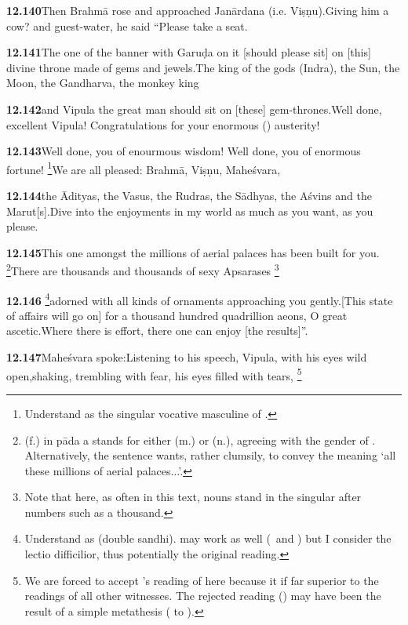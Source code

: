 \textbf{12.140}Then Brahmā rose and approached Janārdana (i.e. Viṣṇu).Giving him a cow? and guest-water, he said ``Please take a seat.%


\textbf{12.141}The one of the banner with Garuḍa on it [should please sit] on [this]                         divine throne made of gems and jewels.The king of the gods (Indra), the Sun, the Moon, the Gandharva, the monkey king%


\textbf{12.142}and Vipula the great man should sit on [these] gem-thrones.Well done, excellent Vipula! Congratulations for your enormous () austerity!%


\textbf{12.143}Well done, you of enourmous wisdom! Well done, you of enormous fortune!%
\footnote{Understand  as the singular vocative masculine of .  }We are all pleased: Brahmā, Viṣṇu, Maheśvara,%


\textbf{12.144}the Ādityas, the Vasus, the Rudras, the Sādhyas, the Aśvins and the Marut[s].Dive into the enjoyments in my world as much as you want, as you please.%


\textbf{12.145}This one amongst the millions of aerial palaces has been built for you.%
\footnote{ (f.) in pāda a stands for either  (m.) or  (n.), agreeing                 with the gender of . Alternatively, the sentence                  wants, rather clumsily, to convey the meaning `all these millions of aerial palaces...'.  }There are thousands and thousands of sexy Apsarases%
\footnote{Note that here, as often in this text, nouns stand in the singular                 after numbers such as a thousand.  }%


\textbf{12.146}%
\footnote{Understand  as  (double sandhi).                  may work as well (\msCb\ and \msNa) but I consider                   the lectio difficilior, thus potentially the original reading.  }adorned with all kinds of ornaments approaching you gently.[This state of affairs will go on] for a thousand hundred quadrillion aeons,                                         O great ascetic.Where there is effort, there one can enjoy [the results]''.%


\textbf{12.147}Maheśvara spoke:Listening to his speech, Vipula, with his eyes wild open,shaking, trembling with fear, his eyes filled with tears,%
\footnote{We are forced to accept \Ed's reading of  here because it                 if far superior to the readings of all other witnesses.                  The rejected reading () may have been the result of                 a simple metathesis ( to ).  }%


